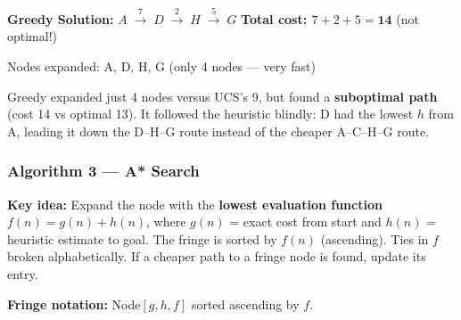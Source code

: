 \documentclass[12pt, a4paper]{article}
\newenvironment{answerbox}{\begin{mdframed}[style=answerframe]}{\end{mdframed}}
\begin{document}
\begin{answerbox}
\textbf{Greedy Solution:} $A \;\xrightarrow{7}\; D \;\xrightarrow{2}\; H \;\xrightarrow{5}\; G$
\hfill \textbf{Total cost: $7+2+5 = \mathbf{14}$} (not optimal!)

Nodes expanded: A, D, H, G \quad(only 4 nodes — very fast)

Greedy expanded just 4 nodes versus UCS's 9, but found a \textbf{suboptimal path} (cost 14 vs optimal 13). It followed the heuristic blindly: D had the lowest $h$ from A, leading it down the D--H--G route instead of the cheaper A--C--H--G route.
\end{answerbox}

\vspace{1em}

\subsubsection*{Algorithm 3 — A* Search}

\textbf{Key idea:} Expand the node with the \textbf{lowest evaluation function}
$f(n) = g(n) + h(n)$, where $g(n)$ = exact cost from start and $h(n)$ = heuristic estimate to goal.
The fringe is sorted by $f(n)$ (ascending). Ties in $f$ broken alphabetically.
If a cheaper path to a fringe node is found, update its entry.

\textbf{Fringe notation:} Node$[g, h, f]$ sorted ascending by $f$.
\end{document}
